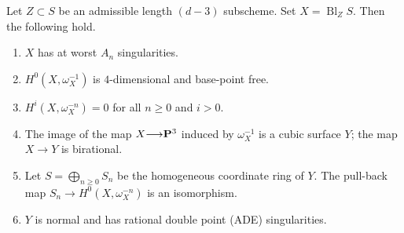 \documentclass[11pt,reqno, letterpaper]{amsart}
\DeclareMathOperator{\Bl}{Bl}
\renewcommand{\to}{{\longrightarrow}}
\numberwithin{equation}{section}
\begin{document}
\begin{proposition}
  \label{prop:admissibleblowup}
Let $Z \subset S$ be an admissible length $(d-3)$ subscheme.
Set $X = \Bl_ZS$.
Then the following hold.
\begin{enumerate}
\item $X$ has at worst $A_n$ singularities.
\item $H^0\left(X, \omega^{-1}_X\right)$ is $4$-dimensional and base-point free.
\item $H^i(X,\omega_X^{-n}) = 0$ for all $n \geq 0$ and $i > 0$.
\item The image of the map $X \to \P^3$ induced by $\omega_X^{-1}$ is a cubic surface $Y$; the map $X \to Y$ is birational.
\item Let $S = \bigoplus_{n \geq 0} S_n$ be the homogeneous coordinate ring of $Y$.
  The pull-back map $S_n \to H^0\left(X, \omega_X^{-n}\right)$ is an isomorphism.
\item $Y$ is normal and has rational double point (ADE) singularities.
\end{enumerate}
\end{proposition}
\end{document}
